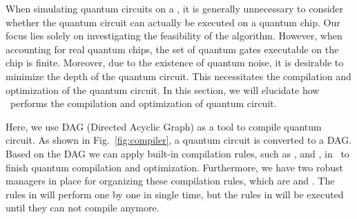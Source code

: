 When simulating quantum circuits on a \Simulator, it is generally unnecessary to consider whether the quantum circuit can actually be executed on a quantum chip. Our focus lies solely on investigating the feasibility of the algorithm. However, when accounting for real quantum chips, the set of quantum gates executable on the chip is finite. Moreover, due to the existence of quantum noise, it is desirable to minimize the depth of the quantum circuit. This necessitates the compilation and optimization of the quantum circuit. In this section, we will elucidate how \MindQuantum\ performs the compilation and optimization of quantum circuit.

Here, we use DAG (Directed Acyclic Graph) as a tool to compile quantum circuit. As shown in Fig.~\ref{fig:compiler}, a quantum circuit is converted to a DAG. Based on the DAG we can apply built-in compilation rules, such as \BasicDecompose, \FullyNeighborCanceler and \GateReplacer, in \MindQuantum\ to finish quantum compilation and optimization. Furthermore, we have two robust managers in place for organizing these compilation rules, which are \SequentialCompiler and \KroneckerSeqCompiler. The rules in \SequentialCompiler will perform one by one in single time, but the rules in \KroneckerSeqCompiler will be executed until they can not compile anymore.

